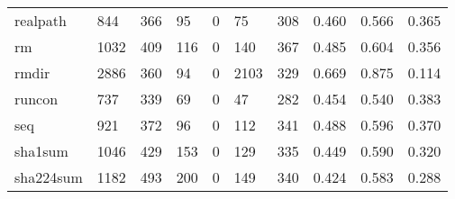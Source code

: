 \begin{longtable}{lp{2.0cm}p{2.0cm}p{2.0cm}p{2.0cm}p{2.0cm}p{2.0cm}p{2.0cm}p{2.0cm}p{2.0cm}}
realpath  &                    844 &                                366 &                                95 &                                0 &                                75 &                             308 &                                0.460 &                                  0.566 &                                0.365 \\
rm        &                   1032 &                                409 &                               116 &                                0 &                               140 &                             367 &                                0.485 &                                  0.604 &                                0.356 \\
rmdir     &                   2886 &                                360 &                                94 &                                0 &                              2103 &                             329 &                                0.669 &                                  0.875 &                                0.114 \\
runcon    &                    737 &                                339 &                                69 &                                0 &                                47 &                             282 &                                0.454 &                                  0.540 &                                0.383 \\
seq       &                    921 &                                372 &                                96 &                                0 &                               112 &                             341 &                                0.488 &                                  0.596 &                                0.370 \\
sha1sum   &                   1046 &                                429 &                               153 &                                0 &                               129 &                             335 &                                0.449 &                                  0.590 &                                0.320 \\
sha224sum &                   1182 &                                493 &                               200 &                                0 &                               149 &                             340 &                                0.424 &                                  0.583 &                                0.288 \\

\end{longtable}
